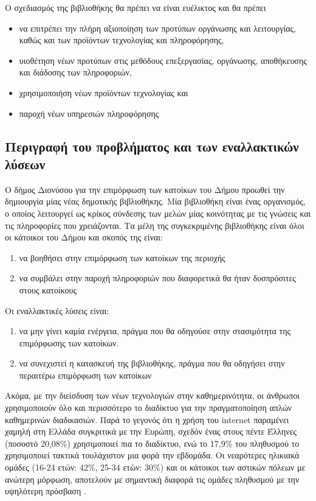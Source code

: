 \documentclass{assignment}
\begin{document}
Ο σχεδιασμός της βιβλιοθήκης θα πρέπει να είναι ευέλικτος και θα πρέπει

\begin{itemize}
\item να επιτρέπει την πλήρη αξιοποίηση των προτύπων οργάνωσης και λειτουργίας, καθώς και των προϊόντων τεχνολογίας και πληροφόρησης, 
\item υιοθέτηση νέων προτύπων στις μεθόδους επεξεργασίας, οργάνωσης, αποθήκευσης και διάδοσης των πληροφοριών,
\item χρησιμοποιήση νέων προϊόντων τεχνολογίας και 
\item παροχή νέων υπηρεσιών πληροφόρησης
\end{itemize}

\subsection{Περιγραφή του προβλήματος και των εναλλακτικών λύσεων}

Ο δήμος Διονύσου για την επιμόρφωση των κατοίκων του Δήμου προωθεί την δημιουργία μίας νέας δημοτικής βιβλιοθήκης. Μία βιβλιοθήκη είναι ένας οργανισμός, ο οποίος λειτουργεί ως κρίκος σύνδεσης των μελών μίας κοινότητας με τις γνώσεις και τις πληροφορίες που χρειάζονται. Τα μέλη της συγκεκριμένης βιβλιοθήκης είναι όλοι οι κάτοικοι του Δήμου και σκοπός της είναι:

\begin{enumerate}
\item να βοηθήσει στην επιμόρφωση των κατοίκων της περιοχής
\item να συμβάλει στην παροχή πληροφοριών που διαφορετικά θα ήταν δυσπρόσιτες στους κατοίκους
\end{enumerate}

Οι εναλλακτικές λύσεις είναι:

\begin{enumerate}
\item να μην γίνει καμία ενέργεια, πράγμα που θα οδηγούσε στην στασιμότητα της επιμόρφωσης των κατοίκων.
\item να συνεχιστεί η κατασκευή της βιβλιοθήκης, πράγμα που θα οδηγήσει στην περαιτέρω επιμόρφωση των κατοίκων
\end{enumerate}


Ακόμα, με την διείσδυση των νέων τεχνολογιών στην καθημερινότητα, οι άνθρωποι χρησιμοποιούν όλο και περισσότερο το διαδίκτυο για την πραγματοποίηση απλών καθημερινών διαδικασιών. Παρά το γεγονός ότι η χρήση του internet παραμένει χαμηλή στη Ελλάδα συγκριτικά με την Ευρώπη, σχεδόν ένας στους πέντε Έλληνες (ποσοστό 20,08\%) χρησιμοποιεί πια το διαδίκτυο, ενώ το 17,9\% του πληθυσμού το χρησιμοποιεί τακτικά τουλάχιστον μια φορά την εβδομάδα. Οι νεαρότερες ηλικιακά ομάδες (16-24 ετών: 42\%, 25-34 ετών: 30\%) και οι κάτοικοι των αστικών πόλεων με ανώτερη μόρφωση, αποτελούν με σημαντική διαφορά τις ομάδες πληθυσμού με την υψηλότερη πρόσβαση \cite{infosoc}. 
\end{document}
